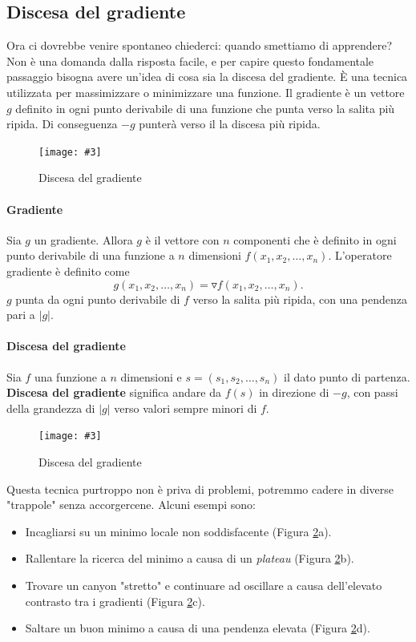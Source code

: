 \documentclass[12pt, twoside, letterpaper]{report}
\newcommand{\img}[4] {
	\begin{figure}[h]
		\caption{#1}
		\centering
		\texttt{[image: \#3]}\\
		\label{#4}
	\end{figure}
}
\begin{document}
			
			\subsection{Discesa del gradiente}
				Ora ci dovrebbe venire spontaneo chiederci: quando smettiamo di apprendere? Non è una domanda dalla risposta facile, e per capire questo fondamentale passaggio bisogna avere un'idea di cosa sia la discesa del gradiente. È una tecnica utilizzata per massimizzare o minimizzare una funzione. Il gradiente è un vettore $g$ definito in ogni punto derivabile di una funzione che punta verso la salita più ripida. Di conseguenza $-g$ punterà verso il la discesa più ripida.
				\img{Discesa del gradiente}{0.5}{gradient_descent_2d.png}{gradient_descent}

				\paragraph{Gradiente} Sia $g$ un gradiente. Allora $g$ è il vettore con $n$ componenti che è definito in ogni punto derivabile di una funzione a $n$ dimensioni $f(x_1, x_2, \dots, x_n)$. L'operatore gradiente è definito come $$g(x_1, x_2, \dots, x_n) = \triangledown f(x_1, x_2, \dots, x_n).$$
					$g$ punta da ogni punto derivabile di $f$ verso la salita più ripida, con una pendenza pari a $|g|$. \cite{kriesel}
				
				\paragraph{Discesa del gradiente} Sia $f$ una funzione a $n$ dimensioni e $s=(s_1, s_2, \dots, s_n)$ il dato punto di partenza. \textbf{Discesa del gradiente} significa andare da $f(s)$ in direzione di $-g$, con passi della grandezza di $|g|$ verso valori sempre minori di $f$. \cite{kriesel}
				
				\img{Discesa del gradiente}{0.5}{gradient_descent.png}{gradient_descent}
				
				Questa tecnica purtroppo non è priva di problemi, potremmo cadere in diverse "trappole" senza accorgercene. Alcuni esempi sono: 
				\begin{itemize}
				 	\item Incagliarsi su un minimo locale non soddisfacente (Figura \ref{gradient_descent}a).
				 	\item Rallentare la ricerca del minimo a causa di un \textit{plateau} (Figura \ref{gradient_descent}b).
				 	\item Trovare un canyon "stretto" e continuare ad oscillare a causa dell'elevato contrasto tra i gradienti (Figura \ref{gradient_descent}c).
				 	\item Saltare un buon minimo a causa di una pendenza elevata (Figura \ref{gradient_descent}d).
				 \end{itemize} 
				
\end{document}
